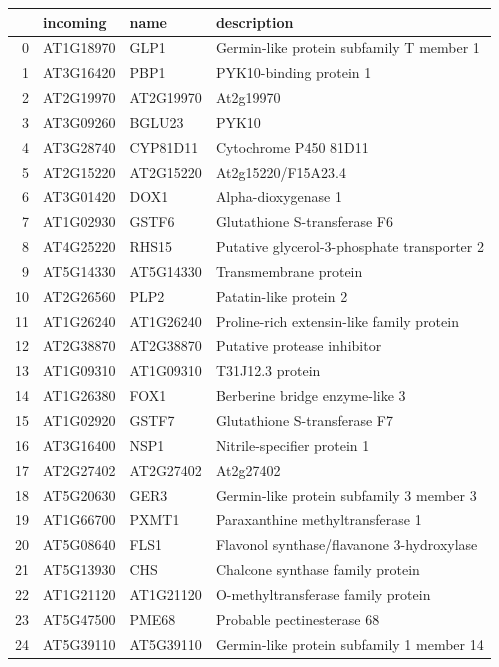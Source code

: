 \documentclass[11pt]{article}
\begin{document}
\begin{center}
\begin{tabular}{rlll}
 & incoming & name & description\\
\hline
0 & AT1G18970 & GLP1 & Germin-like protein subfamily T member 1\\
1 & AT3G16420 & PBP1 & PYK10-binding protein 1\\
2 & AT2G19970 & AT2G19970 & At2g19970\\
3 & AT3G09260 & BGLU23 & PYK10\\
4 & AT3G28740 & CYP81D11 & Cytochrome P450 81D11\\
5 & AT2G15220 & AT2G15220 & At2g15220/F15A23.4\\
6 & AT3G01420 & DOX1 & Alpha-dioxygenase 1\\
7 & AT1G02930 & GSTF6 & Glutathione S-transferase F6\\
8 & AT4G25220 & RHS15 & Putative glycerol-3-phosphate transporter 2\\
9 & AT5G14330 & AT5G14330 & Transmembrane protein\\
10 & AT2G26560 & PLP2 & Patatin-like protein 2\\
11 & AT1G26240 & AT1G26240 & Proline-rich extensin-like family protein\\
12 & AT2G38870 & AT2G38870 & Putative protease inhibitor\\
13 & AT1G09310 & AT1G09310 & T31J12.3 protein\\
14 & AT1G26380 & FOX1 & Berberine bridge enzyme-like 3\\
15 & AT1G02920 & GSTF7 & Glutathione S-transferase F7\\
16 & AT3G16400 & NSP1 & Nitrile-specifier protein 1\\
17 & AT2G27402 & AT2G27402 & At2g27402\\
18 & AT5G20630 & GER3 & Germin-like protein subfamily 3 member 3\\
19 & AT1G66700 & PXMT1 & Paraxanthine methyltransferase 1\\
20 & AT5G08640 & FLS1 & Flavonol synthase/flavanone 3-hydroxylase\\
21 & AT5G13930 & CHS & Chalcone synthase family protein\\
22 & AT1G21120 & AT1G21120 & O-methyltransferase family protein\\
23 & AT5G47500 & PME68 & Probable pectinesterase 68\\
24 & AT5G39110 & AT5G39110 & Germin-like protein subfamily 1 member 14\\
\end{tabular}
\end{center}
\end{document}
